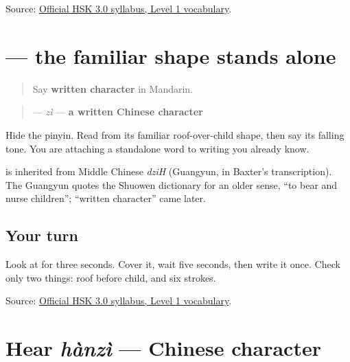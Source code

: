 \begin{tcolorbox}[breakable,colback=teal!4,colframe=teal!35!black,title={Before you move on}]
Source: \href{https://hsk.cn-bj.ufileos.com/3.0/\%E6\%96\%B0\%E7\%89\%88HSK\%E8\%80\%83\%E8\%AF\%95\%E5\%A4\%A7\%E7\%BA\%B21219.pdf}{Official HSK 3.0 syllabus, Level 1 vocabulary}.
\end{tcolorbox}
\section[\texorpdfstring{\zh{字} (zì)}{字 (zì)}]{ — the familiar shape stands alone}

\label{lesson:ZH-C16-zi}



\begin{quote}
Say \textbf{written character} in Mandarin.
\end{quote}

\begin{cousinweb}
\begin{quote}
\textbf{} — \emph{zì} — \textbf{a written Chinese character}
\end{quote}

Hide the pinyin. Read  from its familiar roof-over-child shape, then say its falling tone. You are attaching a standalone word to writing you already know.

\textbf{} is inherited from Middle Chinese \emph{dziH} (Guangyun, in Baxter's transcription). The Guangyun quotes the Shuowen dictionary for an older sense, \textquotedblleft{}to bear and nurse children\textquotedblright{}; \textquotedblleft{}written character\textquotedblright{} came later.
\end{cousinweb}

\subsection*{Your turn}
Look at \textbf{} for three seconds. Cover it, wait five seconds, then write it once. Check only two things: roof before child, and six strokes.

\begin{tcolorbox}[breakable,colback=teal!4,colframe=teal!35!black,title={Before you move on}]
Source: \href{https://hsk.cn-bj.ufileos.com/3.0/\%E6\%96\%B0\%E7\%89\%88HSK\%E8\%80\%83\%E8\%AF\%95\%E5\%A4\%A7\%E7\%BA\%B21219.pdf}{Official HSK 3.0 syllabus, Level 1 vocabulary}.
\end{tcolorbox}
\section[hànzì]{Hear \emph{hànzì} — Chinese character}

